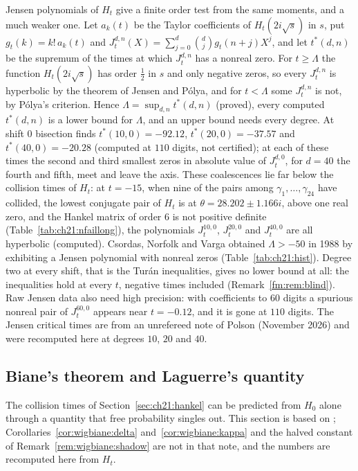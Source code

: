 Jensen polynomials of $H_t$ give a finite order test from the same moments, and a much weaker one. Let $a_k(t)$ be the Taylor coefficients of $H_t(2i\sqrt s)$ in $s$, put $g_t(k)=k!\,a_k(t)$ and $J_t^{d,n}(X)=\sum_{j=0}^d\binom dj g_t(n+j)X^j$, and let $t^*(d,n)$ be the supremum of the times at which $J_t^{d,n}$ has a nonreal zero. For $t\ge\Lambda$ the function $H_t(2i\sqrt s)$ has order $\frac12$ in $s$ and only negative zeros, so every $J_t^{d,n}$ is hyperbolic by the theorem of Jensen and P\'olya, and for $t<\Lambda$ some $J_t^{d,n}$ is not, by P\'olya's criterion. Hence $\Lambda=\sup_{d,n}t^*(d,n)$ (proved), every computed $t^*(d,n)$ is a lower bound for $\Lambda$, and an upper bound needs every degree. At shift $0$ bisection finds $t^*(10,0)=-92.12$, $t^*(20,0)=-37.57$ and $t^*(40,0)=-20.28$ (computed at $110$ digits, not certified); at each of these times the second and third smallest zeros in absolute value of $J_t^{d,0}$, for $d=40$ the fourth and fifth, meet and leave the axis. These coalescences lie far below the collision times of $H_t$: at $t=-15$, when nine of the pairs among $\gamma_1,\dots,\gamma_{24}$ have collided, the lowest conjugate pair of $H_t$ is at $\theta=28.202\pm1.166i$, above one real zero, and the Hankel matrix of order $6$ is not positive definite (Table~\ref{tab:ch21:nfaillong}), the polynomials $J_t^{10,0}$, $J_t^{20,0}$ and $J_t^{40,0}$ are all hyperbolic (computed). Csordas, Norfolk and Varga obtained $\Lambda>-50$ in 1988 by exhibiting a Jensen polynomial with nonreal zeros \cite{CNV88} (Table~\ref{tab:ch21:hist}). Degree two at every shift, that is the Tur\'an inequalities, gives no lower bound at all: the inequalities hold at every $t$, negative times included (Remark~\ref{fm:rem:blind}). Raw Jensen data also need high precision: with coefficients to $60$ digits a spurious nonreal pair of $J_t^{60,0}$ appears near $t=-0.12$, and it is gone at $110$ digits. The Jensen critical times are from an unrefereed note of Polson (November 2026) and were recomputed here at degrees $10$, $20$ and $40$.

\subsection{Biane's theorem and Laguerre's quantity}\label{sec:wigbiane:biane}

The collision times of Section~\ref{sec:ch21:hankel} can be predicted from $H_0$ alone through a quantity that free probability singles out. This section is based on \cite[Section~8]{P26wig}; Corollaries~\ref{cor:wigbiane:delta} and~\ref{cor:wigbiane:kappa} and the halved constant of Remark~\ref{rem:wigbiane:shadow} are not in that note, and the numbers are recomputed here from $H_t$.

